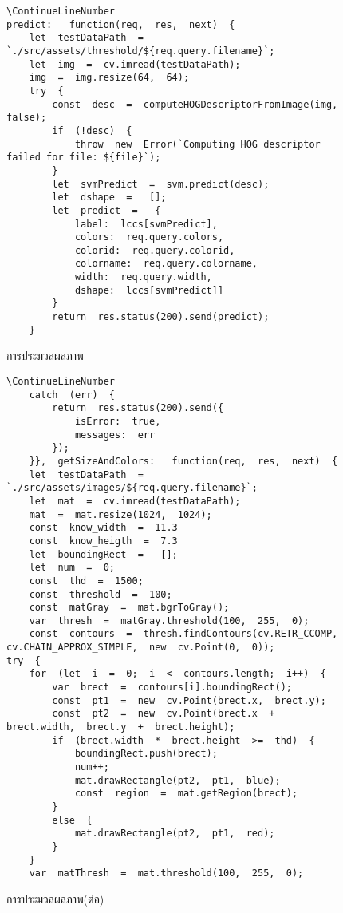 	\begin{figure}[H]
		{\begin{lstlisting}\ContinueLineNumber
predict:   function(req,  res,  next)  {        
    let  testDataPath  =  `./src/assets/threshold/${req.query.filename}`;        
    let  img  =  cv.imread(testDataPath);        
    img  =  img.resize(64,  64);        
    try  {            
        const  desc  =  computeHOGDescriptorFromImage(img,  false);            
        if  (!desc)  {                
            throw  new  Error(`Computing HOG descriptor failed for file: ${file}`);            
        }            
        let  svmPredict  =  svm.predict(desc);            
        let  dshape  =   [];            
        let  predict  =   {                
            label:  lccs[svmPredict],  
            colors:  req.query.colors,  
			colorid:  req.query.colorid,  
			colorname:  req.query.colorname,  
			width:  req.query.width,  
			dshape:  lccs[svmPredict]]            
        }            
        return  res.status(200).send(predict);        
    }   
		\end{lstlisting}}
		\caption{การประมวลผลภาพ}
		\label{Fig:imageProcessing1}
	\end{figure}
	\begin{figure}[H]
		{\begin{lstlisting}\ContinueLineNumber
	catch  (err)  {            
		return  res.status(200).send({                
			isError:  true,  
			messages:  err            
		});        
	}},  getSizeAndColors:   function(req,  res,  next)  {        
	let  testDataPath  =  `./src/assets/images/${req.query.filename}`;        
	let  mat  =  cv.imread(testDataPath);        
	mat  =  mat.resize(1024,  1024);        
	const  know_width  =  11.3       
	const  know_heigth  =  7.3       
	let  boundingRect  =   [];        
	let  num  =  0;        
	const  thd  =  1500;        
	const  threshold  =  100;        
	const  matGray  =  mat.bgrToGray();        
	var  thresh  =  matGray.threshold(100,  255,  0);    
	const  contours  =  thresh.findContours(cv.RETR_CCOMP,  cv.CHAIN_APPROX_SIMPLE,  new  cv.Point(0,  0));        
try  {            
	for  (let  i  =  0;  i  <  contours.length;  i++)  {                
		var  brect  =  contours[i].boundingRect();                
		const  pt1  =  new  cv.Point(brect.x,  brect.y);                
		const  pt2  =  new  cv.Point(brect.x  +  brect.width,  brect.y  +  brect.height);                
		if  (brect.width  *  brect.height  >=  thd)  {                    
			boundingRect.push(brect);                    
			num++;                    
			mat.drawRectangle(pt2,  pt1,  blue);                    
			const  region  =  mat.getRegion(brect);               
		}   
		else  {                    
			mat.drawRectangle(pt2,  pt1,  red);                
		}            
	}           
	var  matThresh  =  mat.threshold(100,  255,  0);           
	\end{lstlisting}}
	\caption{การประมวลผลภาพ(ต่อ)}
	\label{Fig:imageProcessing2}
	\end{figure}

